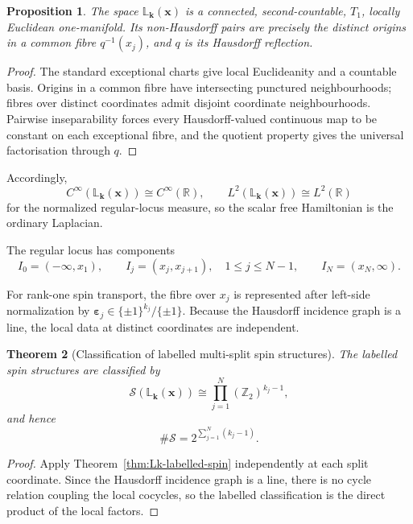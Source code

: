 \documentclass[11pt]{article}
\theoremstyle{plain}
\newtheorem{theorem}{Theorem}[section]
\newtheorem{proposition}[theorem]{Proposition}
\theoremstyle{definition}
\begin{document}
\begin{proposition}
\label{prop:multisplit-basic}
The space \(\mathbb L_{\mathbf k}(\mathbf x)\) is a connected,
second-countable, \(T_1\), locally Euclidean one-manifold. Its
non-Hausdorff pairs are precisely the distinct origins in a common fibre
\(q^{-1}(x_j)\), and \(q\) is its Hausdorff reflection.
\end{proposition}

\begin{proof}
The standard exceptional charts give local Euclideanity and a countable
basis. Origins in a common fibre have intersecting punctured
neighbourhoods; fibres over distinct coordinates admit disjoint coordinate
neighbourhoods. Pairwise inseparability forces every Hausdorff-valued
continuous map to be constant on each exceptional fibre, and the quotient
property gives the universal factorisation through \(q\).
\end{proof}

Accordingly,
\[
  C^\infty(
    \mathbb L_{\mathbf k}(\mathbf x)
  )
  \cong
  C^\infty(\mathbb R),
  \qquad
  L^2(
    \mathbb L_{\mathbf k}(\mathbf x)
  )
  \cong
  L^2(\mathbb R)
\]
for the normalized regular-locus measure, so the scalar free Hamiltonian is
the ordinary Laplacian.

The regular locus has components
\[
  I_0=(-\infty,x_1),
  \qquad
  I_j=(x_j,x_{j+1}),
  \quad
  1\leq j\leq N-1,
  \qquad
  I_N=(x_N,\infty).
\]

For rank-one spin transport, the fibre over \(x_j\) is represented after
left-side normalization by
\(\boldsymbol{\varepsilon}_j \in \{\pm1\}^{k_j}/\{\pm1\}\).
Because the Hausdorff incidence graph is a line, the local data at distinct
coordinates are independent.

\begin{theorem}[Classification of labelled multi-split spin structures]
\label{thm:multisplit-spin-classification}
The labelled spin structures are classified by
\[
  \mathscr S(
    \mathbb L_{\mathbf k}(\mathbf x)
  )
  \cong
  \prod_{j=1}^{N}
  (\mathbb Z_2)^{k_j-1},
\]
and hence
\[
  \#\mathscr S
  =
  2^{\sum_{j=1}^{N}(k_j-1)}.
\]
\end{theorem}

\begin{proof}
Apply Theorem~\ref{thm:Lk-labelled-spin} independently at each split
coordinate. Since the Hausdorff incidence graph is a line, there is no cycle
relation coupling the local cocycles, so the labelled classification is the
direct product of the local factors.
\end{proof}
\end{document}
